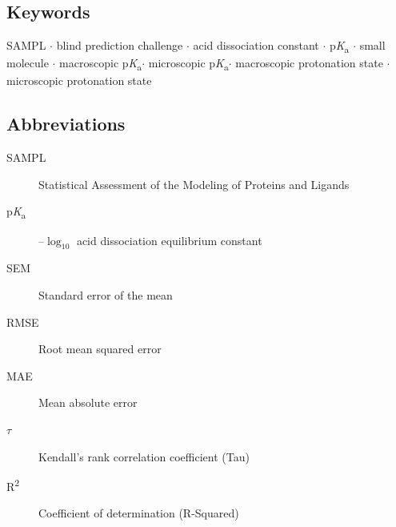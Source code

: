 \documentclass[9pt,lineno,final]{elife}
\newcommand{\pKa}{p\textit{K}\textsubscript{a}}
\begin{document}
\begin{abstract}
For a subset of molecules, we utilized experimentally determined microstates based on NMR to evaluate the dominant tautomer predictions for each macroscopic state. Prediction of dominant tautomers were a major source of error for microscopic \pKa{} predictions, especially errors in charged tautomers. 
The SAMPL6 \pKa{} Challenge demonstrated the need for improving \pKa{} prediction methods for drug-like molecules, especially for challenging moieties and multiprotic molecules. 
The inaccuracy of \pKa{} predictions as observed in this challenge can be detrimental to the performance of protein-ligand binding affinity predictions due to errors in predicted dominant charge and tautomeric states and errors in the calculation of free energy corrections for multiple protonation states of the ligand.

\end{abstract}

\subsection{Keywords}
SAMPL $\cdot$ blind prediction challenge $\cdot$ acid dissociation constant $\cdot$ \pKa{} $\cdot$ small molecule $\cdot$ macroscopic \pKa $\cdot$ microscopic \pKa  $\cdot$ macroscopic protonation state $\cdot$ microscopic protonation state

\subsection{Abbreviations}
\begin{description}
\item[SAMPL] Statistical Assessment of the Modeling of Proteins and Ligands
\item[\pKa]  --${\log_{10}}$ acid dissociation equilibrium constant 
\item[SEM] Standard error of the mean
\item[RMSE] Root mean squared error
\item[MAE] Mean absolute error
\item[{$\tau$}] Kendall's rank correlation coefficient (Tau)
\item[R\textsuperscript{2}] Coefficient of determination (R-Squared)
\end{description}


\end{document}
